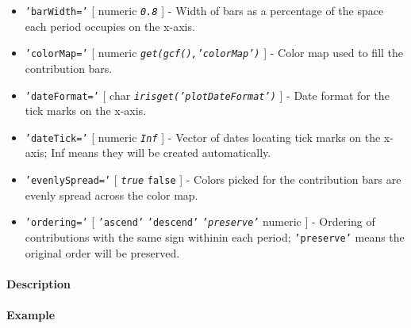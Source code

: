\begin{itemize}
\item
  \texttt{'barWidth='} {[} numeric \textbar{} \emph{\texttt{0.8}} {]} -
  Width of bars as a percentage of the space each period occupies on the
  x-axis.
\item
  \texttt{'colorMap='} {[} numeric \textbar{}
  \emph{\texttt{get(gcf(),'colorMap')}} {]} - Color map used to fill the
  contribution bars.
\item
  \texttt{'dateFormat='} {[} char \textbar{}
  \emph{\texttt{irisget('plotDateFormat')}} {]} - Date format for the
  tick marks on the x-axis.
\item
  \texttt{'dateTick='} {[} numeric \textbar{} \emph{\texttt{Inf}} {]} -
  Vector of dates locating tick marks on the x-axis; Inf means they will
  be created automatically.
\item
  \texttt{'evenlySpread='} {[} \emph{\texttt{true}} \textbar{}
  \texttt{false} {]} - Colors picked for the contribution bars are
  evenly spread across the color map.
\item
  \texttt{'ordering='} {[} \texttt{'ascend'} \textbar{}
  \texttt{'descend'} \textbar{} \emph{\texttt{'preserve'}} \textbar{}
  numeric {]} - Ordering of contributions with the same sign withinin
  each period; \texttt{'preserve'} means the original order will be
  preserved.
\end{itemize}

\paragraph{Description}

\paragraph{Example}


